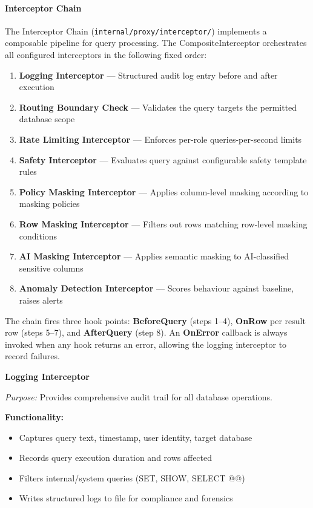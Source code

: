 \paragraph{Interceptor Chain}

The Interceptor Chain (\texttt{internal/proxy/interceptor/}) implements a composable pipeline for query processing. The CompositeInterceptor orchestrates all configured interceptors in the following fixed order:

\begin{enumerate}[leftmargin=*]
    \item \textbf{Logging Interceptor} — Structured audit log entry before and after execution
    \item \textbf{Routing Boundary Check} — Validates the query targets the permitted database scope
    \item \textbf{Rate Limiting Interceptor} — Enforces per-role queries-per-second limits
    \item \textbf{Safety Interceptor} — Evaluates query against configurable safety template rules
    \item \textbf{Policy Masking Interceptor} — Applies column-level masking according to masking policies
    \item \textbf{Row Masking Interceptor} — Filters out rows matching row-level masking conditions
    \item \textbf{AI Masking Interceptor} — Applies semantic masking to AI-classified sensitive columns
    \item \textbf{Anomaly Detection Interceptor} — Scores behaviour against baseline, raises alerts
\end{enumerate}

The chain fires three hook points: \textbf{BeforeQuery} (steps 1–4), \textbf{OnRow} per result row (steps 5–7), and \textbf{AfterQuery} (step 8). An \textbf{OnError} callback is always invoked when any hook returns an error, allowing the logging interceptor to record failures.

\vspace{0.3cm}

\textbf{Logging Interceptor}

\textit{Purpose:} Provides comprehensive audit trail for all database operations.

\textbf{Functionality:}
\begin{itemize}[leftmargin=*]
    \item Captures query text, timestamp, user identity, target database
    \item Records query execution duration and rows affected
    \item Filters internal/system queries (SET, SHOW, SELECT @@)
    \item Writes structured logs to file for compliance and forensics
\end{itemize}

